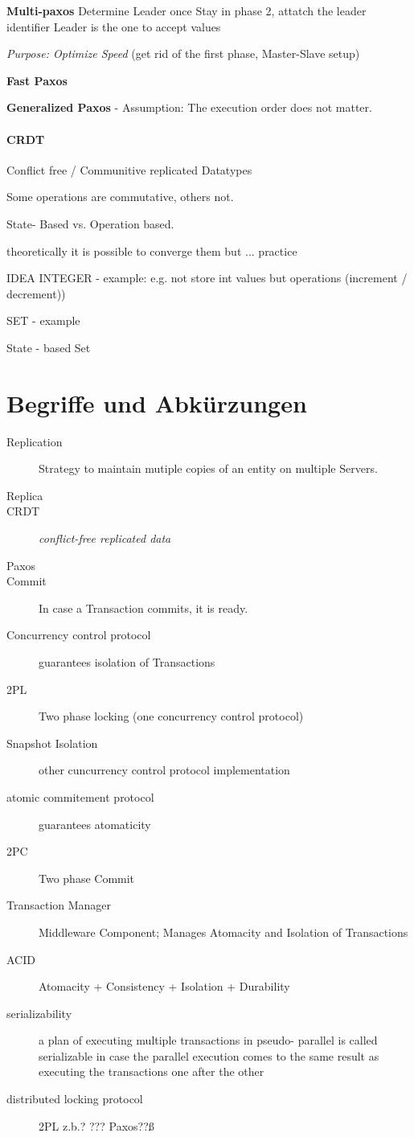 \documentclass[a4paper,12pt]{article}%
\begin{document}
	{\bf Multi-paxos}
	Determine Leader once
	Stay in phase 2, attatch the leader identifier
	Leader is the one to accept values
	
	{\it Purpose:  Optimize Speed} (get rid of the first phase, Master-Slave setup)
	
	
	{\bf Fast Paxos}
	
	{\bf Generalized Paxos}
	- Assumption: The execution order does not matter.

\paragraph{CRDT}
Conflict free / Communitive replicated Datatypes

Some operations are commutative, others not.

State- Based vs. Operation based.

theoretically it is possible to converge them but ... practice




IDEA
INTEGER  - example: 
e.g. not store int values but operations (increment / decrement))

SET - example

State - based Set


\section{Begriffe und Abkürzungen}

\begin{description}
	\item[Replication] Strategy to maintain mutiple copies of an entity on multiple Servers.
	\item[Replica] 
	\item[CRDT] {\it conflict-free replicated data}
	\item[Paxos] 
	\item[Commit] In case a Transaction commits, it is ready.
	\item[Concurrency control protocol] guarantees isolation of Transactions
	\item[2PL] Two phase locking (one concurrency control protocol)
	\item[Snapshot Isolation] other cuncurrency control protocol implementation
	\item[atomic commitement protocol] guarantees atomaticity
	\item[2PC] Two phase Commit
	\item[Transaction Manager] Middleware Component; Manages Atomacity and Isolation of Transactions
	\item[ACID]  Atomacity + Consistency + Isolation + Durability
	\item[serializability] a plan of executing multiple transactions in pseudo- parallel is called serializable in case the parallel execution comes to the same result as executing the transactions one after the other
	\item[distributed locking protocol] 2PL z.b.? ??? Paxos??ß
	
\end{description}
\end{document}

